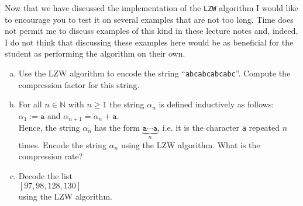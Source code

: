 Now that we have discussed the implementation of the \texttt{LZW} algorithm I would like to
encourage you to test it on several examples that are not too long.  Time does not permit me
to discuss examples of this kind in these lecture notes and, indeed, I do not think that discussing
these examples here would be as beneficial for the student as performing the algorithm on their own.

\exercise
\begin{enumerate}[(a)]
\item Use the LZW algorithm to encode the string ``\texttt{abcabcabcabc}''.  Compute the compression
      factor for this string.
\item For all $n \in \mathbb{N}$ with $n \geq 1$ the string $\alpha_n$ is defined inductively as
      follows:
      \\[0.2cm]
      \hspace*{1.3cm} $\alpha_1 := \texttt{a}$ \quad and \quad $\alpha_{n+1} = \alpha_n + \texttt{a}$.
      \\[0.2cm]
      Hence, the string $\alpha_n$ has the form $\underbrace{\texttt{a} \cdots \texttt{a}}_n$,
      i.e. it is the character \texttt{a} repeated $n$ times.
      Encode the string $\alpha_n$ using the LZW algorithm.  What is the compression rate?
\item Decode the list 
      \\[0.2cm]
      \hspace*{1.3cm}
      $[97, 98, 128, 130]$
      \\[0.2cm]
      using the LZW algorithm.  \eox
\end{enumerate}

